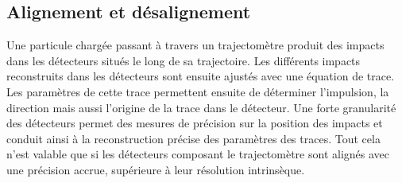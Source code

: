   \subsection{Alignement et d\'esalignement}
  
   Une particule charg\'ee passant \`a travers un trajectom\`etre produit des impacts dans les d\'etecteurs situ\'es le long de sa trajectoire. Les diff\'erents impacts reconstruits dans les d\'etecteurs sont ensuite ajust\'es avec une \'equation de trace. Les param\`etres de cette trace permettent ensuite de d\'eterminer l'impulsion, la direction mais aussi l'origine de la trace dans le d\'etecteur. Une forte granularit\'e des d\'etecteurs permet des mesures de pr\'ecision sur la position des impacts et conduit ainsi \`a la reconstruction pr\'ecise des param\`etres des traces. Tout cela n'est valable que si les d\'etecteurs composant le trajectom\`etre sont align\'es avec une pr\'ecision accrue, sup\'erieure \`a leur r\'esolution intrins\`eque.
   
   

   
